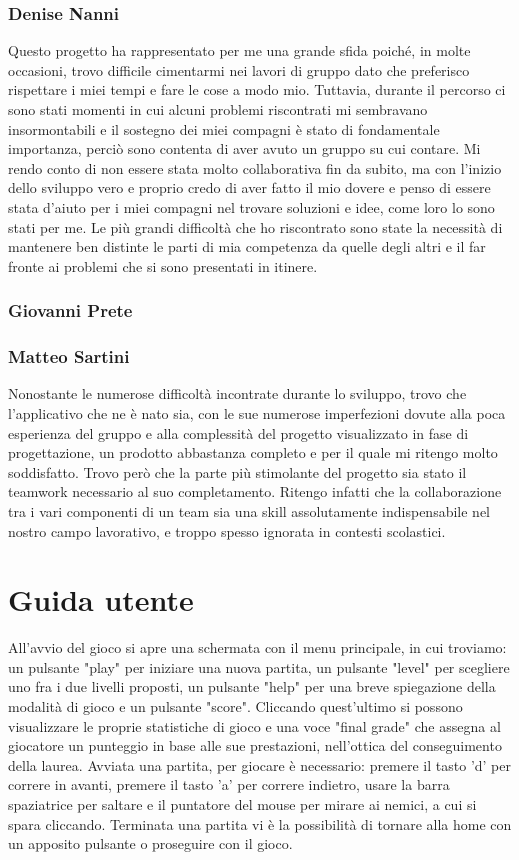\documentclass[a4paper,12pt]{report}
\begin{document}
\subsection{Denise Nanni}
Questo progetto ha rappresentato per me una grande sfida poiché, in molte occasioni, trovo difficile cimentarmi nei lavori di gruppo dato che preferisco rispettare i miei tempi e fare le cose a modo mio. Tuttavia, durante il percorso ci sono stati momenti in cui alcuni problemi riscontrati mi sembravano insormontabili e il sostegno dei miei compagni è stato di fondamentale importanza, perciò sono contenta di aver avuto un gruppo su cui contare.
Mi rendo conto di non essere stata molto collaborativa fin da subito, ma con l'inizio dello sviluppo vero e proprio credo di aver fatto il mio dovere e penso di essere stata d'aiuto per i miei compagni nel trovare soluzioni e idee, come loro lo sono stati per me.
Le più grandi difficoltà che ho riscontrato sono state la necessità di mantenere ben distinte le parti di mia competenza da quelle degli altri e il far fronte ai problemi che si sono presentati in itinere.
\subsection{Giovanni Prete}
\subsection{Matteo Sartini}
Nonostante le numerose difficoltà incontrate durante lo sviluppo, trovo che l’applicativo che ne è nato sia, con le sue numerose imperfezioni dovute alla poca esperienza del gruppo e alla complessità del progetto visualizzato in fase di progettazione, un prodotto abbastanza completo e per il quale mi ritengo molto soddisfatto.
Trovo però che la parte più stimolante del progetto sia stato il teamwork necessario al suo completamento. Ritengo infatti che la collaborazione tra i vari componenti di un team sia una skill assolutamente indispensabile nel nostro campo lavorativo, e troppo spesso ignorata in contesti scolastici.

\chapter{Guida utente}
All'avvio del gioco si apre una schermata con il menu principale, in cui troviamo: un pulsante "play" per iniziare una nuova partita, un pulsante "level" per scegliere uno fra i due livelli proposti, un pulsante "help" per una breve spiegazione della modalità di gioco e un pulsante "score".
Cliccando quest'ultimo si possono visualizzare le proprie statistiche di gioco e una voce "final grade" che assegna al giocatore un punteggio in base alle sue prestazioni, nell'ottica del conseguimento della laurea.
Avviata una partita, per giocare è necessario: premere il tasto 'd' per correre in avanti, premere il tasto 'a' per correre indietro, usare la barra spaziatrice per saltare e il puntatore del mouse per mirare ai nemici, a cui si spara cliccando.
Terminata una partita vi è la possibilità di tornare alla home con un apposito pulsante o proseguire con il gioco.
\end{document}
